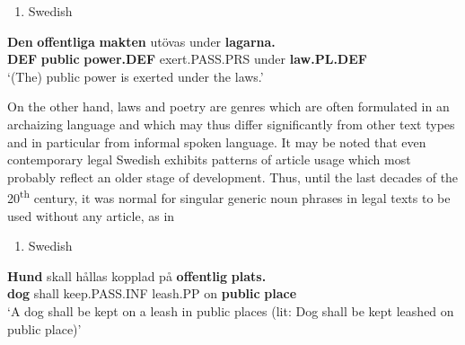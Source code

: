 \begin{enumerate} %
\item 
Swedish

\end{enumerate} %
\ea\label{}
\gll \textbf{Den}\textbf{  offentliga}\textbf{  makten} utövas  under  \textbf{lagarna.}\\


\textbf{DEF} \textbf{public} \textbf{power.DEF} exert.PASS.PRS  under  \textbf{law.PL.DEF}\\ %


 ‘(The) public power is exerted under the laws.’
\z


On the other hand, laws and poetry are genres which are often formulated in an archaizing language and which may thus differ significantly from other text types and in particular from informal spoken language. It may be noted that even contemporary legal Swedish exhibits patterns of article usage which most probably reflect an older stage of development. Thus, until the last decades of the 20\textsuperscript{th} century, it was normal for singular generic noun phrases in legal texts to be used without any article, as in 

\begin{enumerate} %
\item 
Swedish

\end{enumerate} %
\ea\label{}
\gll \textbf{Hund} skall  hållas  kopplad  på  \textbf{offentlig}\textbf{  plats.}\\


\textbf{dog} shall  keep.PASS.INF  leash.PP  on  \textbf{public} \textbf{place}\\ %


‘A dog shall be kept on a leash in public places (lit: Dog shall be kept leashed on public place)’
\z


